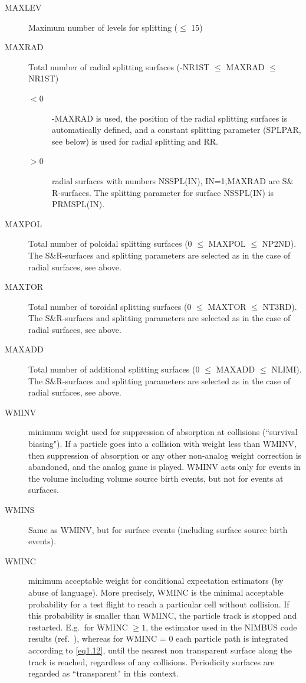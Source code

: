 \begin{description}
  \item[MAXLEV] Maximum number of levels for splitting ($\le$ 15)
  \item[MAXRAD] Total number of radial splitting surfaces (-NR1ST $\le$ MAXRAD $\le$ NR1ST)
        \begin{description}
          \item[$< 0$] -MAXRAD is used, the position of the radial splitting surfaces is automatically defined, and a constant splitting parameter (SPLPAR, see below) is used for radial splitting and RR.
          \item[$> 0$] radial surfaces with numbers NSSPL(IN), IN=1,MAXRAD are S$\&$R-surfaces.
                The splitting parameter for surface NSSPL(IN) is PRMSPL(IN).
        \end{description}
  \item[MAXPOL] Total number of poloidal splitting surfaces (0 $\le$ MAXPOL $\le$ NP2ND).
        The S$\&$R-surfaces and splitting parameters are selected as in the case of radial surfaces, see above.
  \item[MAXTOR] Total number of toroidal splitting surfaces (0 $\le$ MAXTOR $\le$ NT3RD).
        The S$\&$R-surfaces and splitting parameters are selected as in the case of radial surfaces, see above.
  \item[MAXADD] Total number of additional splitting surfaces (0 $\le$ MAXADD $\le$ NLIMI).
        The S$\&$R-surfaces and splitting parameters are selected as in the case of radial surfaces, see above.
  \item[WMINV] minimum weight used for suppression of absorption at collisions (``survival biasing").
        If a particle goes into a collision with weight less than WMINV, then suppression of absorption or any other non-analog weight correction is abandoned, and the analog game is played.
        WMINV acts only for events in the volume including volume source birth events, but not for events at surfaces.
  \item[WMINS] Same as WMINV, but for surface events (including surface source birth events).
  \item[WMINC] minimum acceptable weight for conditional expectation estimators (by abuse of language).
        More precisely, WMINC is the minimal acceptable probability for a test flight to reach a particular cell without collision.
        If this probability is smaller than WMINC, the particle track is stopped and restarted.
        E.g.\ for WMINC $\ge 1$, the estimator used in the NIMBUS code results (ref.\ \cite{kn:Cupini}), whereas for WMINC = 0 each particle path is integrated according to \cref{eq1.12}, until the nearest non transparent surface along the track is reached, regardless of any collisions.
        Periodicity surfaces are regarded as ``transparent" in this context.


\end{description}
